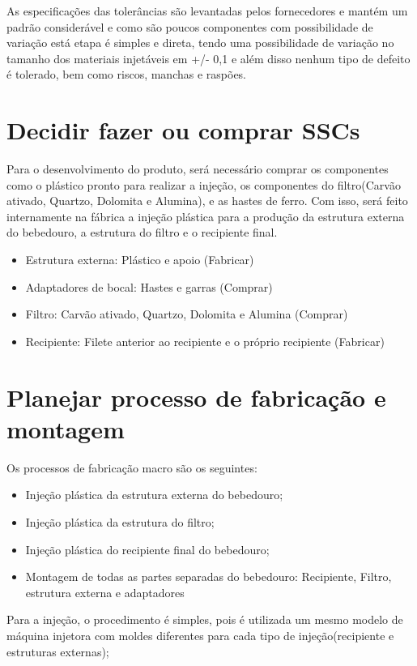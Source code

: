 \documentclass[
	12pt,				%
	openright,			%
	oneside,			%
	a4paper,			%
	english,			%
	french,				%
	spanish,			%
	brazil				%
	]{abntex2}
\begin{document}
As especificações das tolerâncias são levantadas pelos fornecedores e mantém um padrão considerável e como são poucos componentes com possibilidade de variação está etapa é simples e direta, tendo uma possibilidade de variação no tamanho dos materiais injetáveis em  +/- 0,1 e além disso nenhum tipo de defeito é tolerado, bem como riscos, manchas e raspões.

\section{Decidir fazer ou comprar SSCs}

Para o desenvolvimento do produto, será necessário comprar os componentes como o plástico pronto para realizar a injeção, os componentes do filtro(Carvão ativado,  Quartzo, Dolomita e Alumina), e as hastes de ferro. Com isso, será feito internamente na fábrica a injeção plástica para a produção da estrutura externa do bebedouro, a estrutura do filtro e o recipiente final.

\begin{itemize}
\item Estrutura externa: Plástico e apoio (Fabricar)
\item Adaptadores de bocal: Hastes e garras (Comprar)
\item Filtro: Carvão ativado,  Quartzo, Dolomita e Alumina (Comprar)
\item Recipiente: Filete anterior ao recipiente e o próprio recipiente (Fabricar)
\end{itemize}


\section{Planejar processo de fabricação e montagem}

Os processos de fabricação macro são os seguintes:

\begin{itemize}
\item Injeção plástica da estrutura externa do bebedouro;
\item Injeção plástica da estrutura do filtro;
\item Injeção plástica do recipiente final do bebedouro;
\item Montagem de todas as partes separadas do bebedouro: Recipiente, Filtro, estrutura externa e adaptadores
\end{itemize} 
	
Para a injeção, o procedimento é simples, pois é utilizada um mesmo modelo de máquina injetora com moldes diferentes para cada tipo de injeção(recipiente e estruturas externas);
\end{document}
